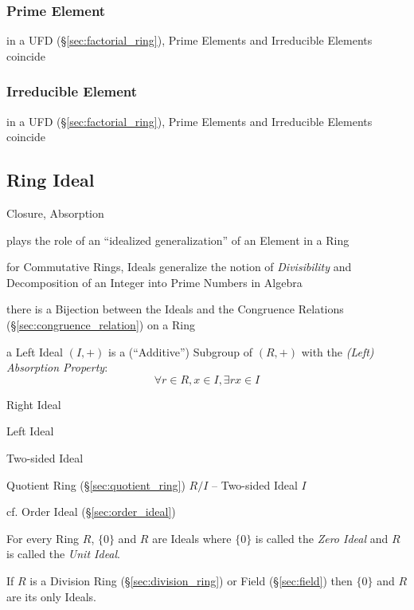 \subsubsection{Prime Element}\label{sec:prime_element}

in a UFD (\S\ref{sec:factorial_ring}), Prime Elements and Irreducible Elements
coincide



\subsubsection{Irreducible Element}\label{sec:irreducible_element}

in a UFD (\S\ref{sec:factorial_ring}), Prime Elements and Irreducible Elements
coincide



\subsection{Ring Ideal}\label{sec:ring_ideal}

Closure, Absorption

plays the role of an ``idealized generalization'' of an Element in a Ring

for Commutative Rings, Ideals generalize the notion of \emph{Divisibility} and
Decomposition of an Integer into Prime Numbers in Algebra

there is a Bijection between the Ideals and the Congruence Relations
(\S\ref{sec:congruence_relation}) on a Ring

a Left Ideal $(I, +)$ is a (``Additive'') Subgroup of $(R, +)$ with the
\emph{(Left) Absorption Property}:
\[
  \forall r \in R, x \in I, \exists rx \in I
\]

Right Ideal

Left Ideal

Two-sided Ideal

Quotient Ring (\S\ref{sec:quotient_ring}) $R / I$ -- Two-sided Ideal $I$

\fist cf. Order Ideal (\S\ref{sec:order_ideal})

For every Ring $R$, $\{0\}$ and $R$ are Ideals where $\{0\}$ is called
the \emph{Zero Ideal} and $R$ is called the \emph{Unit Ideal}.

If $R$ is a Division Ring (\S\ref{sec:division_ring}) or Field
(\S\ref{sec:field}) then $\{0\}$ and $R$ are its only Ideals.

